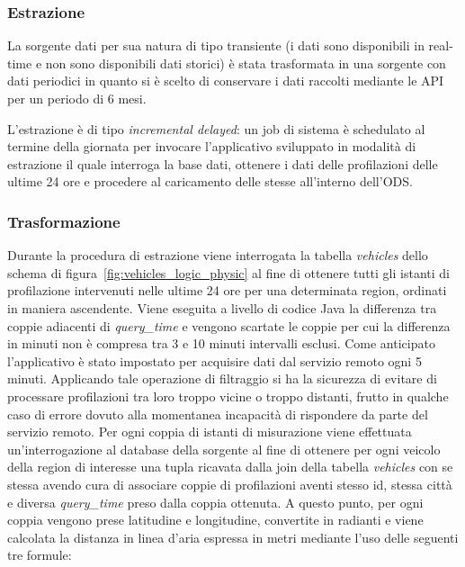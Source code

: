 \subsubsection{Estrazione}

La sorgente dati per sua natura di tipo transiente (i dati sono disponibili in
real-time e non sono disponibili dati storici) è stata trasformata in una
sorgente con dati periodici in quanto si è scelto di conservare i dati raccolti
mediante le API per un periodo di 6 mesi.

L'estrazione è di tipo \textit{incremental delayed}: un job di sistema è
schedulato al termine della giornata per invocare l'applicativo sviluppato in
modalità di estrazione il quale interroga la base dati, ottenere i dati delle
profilazioni delle ultime 24 ore e procedere al caricamento delle stesse
all'interno dell'ODS.

\subsubsection{Trasformazione}

Durante la procedura di estrazione viene interrogata la tabella
\textit{vehicles} dello schema di figura~\ref{fig:vehicles_logic_physic} al fine
di ottenere tutti gli istanti di profilazione intervenuti nelle ultime 24 ore
per una determinata region, ordinati in maniera ascendente. Viene eseguita
a livello di codice Java la differenza tra coppie adiacenti di
\textit{query\_time} e vengono scartate le coppie per cui la differenza in
minuti non è compresa tra 3 e 10 minuti intervalli esclusi. Come anticipato
l'applicativo è stato impostato per acquisire dati dal servizio remoto ogni 5
minuti. Applicando tale operazione di filtraggio si ha la sicurezza di evitare
di processare profilazioni tra loro troppo vicine o troppo distanti, frutto in
qualche caso di errore dovuto alla momentanea incapacità di rispondere da parte
del servizio remoto. Per ogni coppia di istanti di misurazione viene effettuata
un'interrogazione al database della sorgente al fine di ottenere per ogni veicolo
della region di interesse una tupla ricavata dalla join della tabella
\textit{vehicles} con se stessa avendo cura di associare coppie di profilazioni
aventi stesso id, stessa città e diversa \textit{query\_time} preso dalla coppia
ottenuta. A questo punto, per ogni coppia vengono prese latitudine e longitudine,
convertite in radianti e viene calcolata la distanza in linea d'aria espressa in
metri mediante l'uso delle seguenti tre formule:

